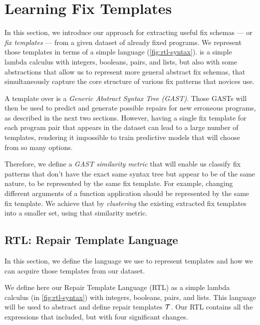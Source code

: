 \section{Learning Fix Templates}
\label{sec:templ-cluster}

In this section, we introduce our approach for extracting useful fix schemas ---
or \emph{fix templates} --- from a given dataset of already fixed programs. We
represent those templates in terms of a simple language \repairLang
(\autoref{fig:rtl-syntax}). \repairLang is a simple lambda calculus with integers,
booleans, pairs, and lists, but also with some abstractions that allow us to
represent more general abstract fix schemas, that simultaneously capture the
core structure of various fix patterns that novices use.

A template over \repairLang is a \emph{Generic Abstract Syntax Tree (GAST)}.
Those GASTs will then be used to predict and generate possible repairs for new
erroneous programs, as described in the next two sections. However, having a
single fix template for each program pair that appears in the dataset can lead
to a large number of templates, rendering it impossible to train predictive models
that will choose from so many options.

Therefore, we define a \emph{GAST similarity metric} that will enable us
classify fix patterns that don't have the exact same syntax tree but appear to
be of the same nature, to be represented by the same fix template. For example,
changing different arguments of a function application should be represented by
the same fix template. We achieve that by \emph{clustering} the existing
extracted fix templates into a smaller set, using that similarity metric.



\subsection{RTL: Repair Template Language}
\label{subsec:lang}

In this section, we define the language we use to represent
templates and how we can acquire those templates from our dataset.

We define here our Repair Template Language (RTL) as a simple lambda calculus
(\repairLang in \autoref{fig:rtl-syntax}) with integers, booleans, pairs, and lists.
This language will be used to abstract and define repair templates $\mathcal{T}$. Our RTL
contains all the expressions that \lang included, but with four significant
changes.

